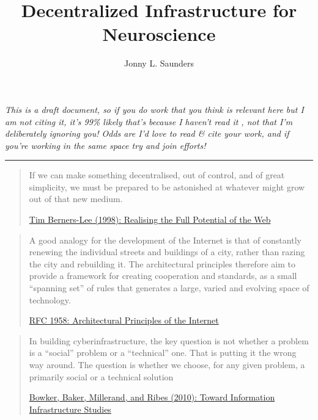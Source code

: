 \documentclass[notoc]{tufte-book}
\title{Decentralized Infrastructure for Neuroscience}
\author{Jonny L. Saunders}
\begin{document}
\frontmatter

\clearpage

\maketitle

\pagebreak

\tableofcontents

\clearpage

\mainmatter


\emph{This is a draft document, so if you do work that you think is
relevant here but I am not citing it, it's 99\% likely that's because I
haven't read it , not that I'm deliberately ignoring you! Odds are I'd
love to read \& cite your work, and if you're working in the same space
try and join efforts!}

\begin{center}\rule{0.5\linewidth}{0.5pt}\end{center}

\begin{quote}
If we can make something decentralised, out of control, and of great
simplicity, we must be prepared to be astonished at whatever might grow
out of that new medium.

\href{https://www.w3.org/1998/02/Potential.html}{Tim Berners-Lee (1998):
Realising the Full Potential of the Web}
\end{quote}

\begin{quote}
A good analogy for the development of the Internet is that of constantly
renewing the individual streets and buildings of a city, rather than
razing the city and rebuilding it. The architectural principles
therefore aim to provide a framework for creating cooperation and
standards, as a small ``spanning set'' of rules that generates a large,
varied and evolving space of technology.

\href{https://datatracker.ietf.org/doc/html/rfc1958}{RFC 1958:
Architectural Principles of the Internet}
\end{quote}

\begin{quote}
In building cyberinfrastructure, the key question is not whether a
problem is a ``social'' problem or a ``technical'' one. That is putting
it the wrong way around. The question is whether we choose, for any
given problem, a primarily social or a technical solution

\href{https://doi.org/10.1007/978-1-4020-9789-8_5}{Bowker, Baker, Millerand, and Ribes (2010): Toward Information Infrastructure Studies}

\end{quote}
\end{document}
